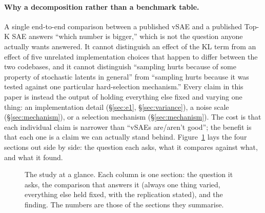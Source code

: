 \documentclass[11pt]{article}
\begin{document}
\paragraph{Why a decomposition rather than a benchmark table.} A single
end-to-end comparison between a published vSAE and a published Top-K SAE
answers ``which number is bigger,'' which is not the question anyone actually
wants answered. It cannot distinguish an effect of the KL term from an effect
of five unrelated implementation choices that happen to differ between the two
codebases, and it cannot distinguish ``sampling hurts because of some property
of stochastic latents in general'' from ``sampling hurts because it was tested
against one particular hard-selection mechanism.'' Every claim in this paper
is instead the output of holding everything else fixed and varying one thing:
an implementation detail (\S\ref{sec:e1}, \S\ref{sec:variance}), a noise scale
(\S\ref{sec:mechanism}), or a selection mechanism
(\S\ref{sec:mechanism}). The cost is that each individual claim is narrower
than ``vSAEs are/aren't good''; the benefit is that each one is a claim we can
actually stand behind. Figure~\ref{fig:studymap} lays the four sections out
side by side: the question each asks, what it compares against what, and what
it found.

\begin{figure}[t]
\centering

\caption{The study at a glance. Each column is one section: the question it
asks, the comparison that answers it (always one thing varied, everything else
held fixed, with the replication stated), and the finding. The numbers are
those of the sections they summarise.}
\label{fig:studymap}
\end{figure}
\end{document}
